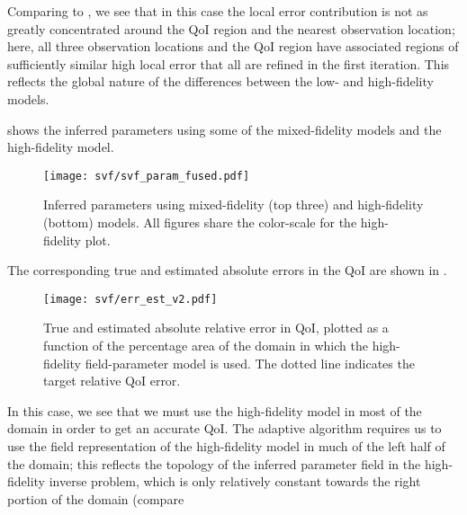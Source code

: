 %
Comparing to , we see that in this case the local error contribution is not as greatly concentrated around the QoI region and the nearest observation location; here, all three observation locations and the QoI region have associated regions of sufficiently similar high local error that all are refined in the first iteration. This reflects the global nature of the differences between the low- and high-fidelity models. 

 shows the inferred parameters using some of the mixed-fidelity models and the high-fidelity model.
%
\begin{figure}[htbp]
\centering
\texttt{[image: svf/svf\_param\_fused.pdf]}
\caption{Inferred parameters using mixed-fidelity (top three) and high-fidelity (bottom) models. All figures share the color-scale for the high-fidelity plot.}
\label{fig:svfRefParams}
\end{figure}
%
The corresponding true and estimated absolute errors in the QoI are shown in .
%
\begin{figure}[htbp]
\centering
\texttt{[image: svf/err\_est\_v2.pdf]}
\caption{True and estimated absolute relative error in QoI, plotted as a function of the percentage area of the domain in which the high-fidelity field-parameter model is used. The dotted line indicates the target relative QoI error.}
\label{fig:svfErr}
\end{figure}
%
In this case, we see that we must use the high-fidelity model in most of the domain in order to get an accurate QoI. The adaptive algorithm requires us to use the field representation of the high-fidelity model in much of the left half of the domain; this reflects the topology of the inferred parameter field in the high-fidelity inverse problem, which is only relatively constant towards the right portion of the domain (compare 
